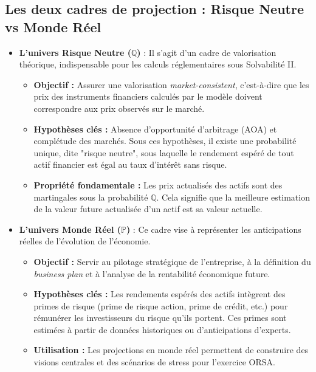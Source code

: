 \subsection{Les deux cadres de projection : Risque Neutre vs Monde Réel}
\begin{itemize}
    \item \textbf{L'univers Risque Neutre ($\mathbb{Q}$)} : Il s'agit d'un cadre de valorisation théorique, indispensable pour les calculs réglementaires sous Solvabilité II.
    \begin{itemize}
        \item \textbf{Objectif :} Assurer une valorisation \textit{market-consistent}, c'est-à-dire que les prix des instruments financiers calculés par le modèle doivent correspondre aux prix observés sur le marché.
        \item \textbf{Hypothèses clés :} Absence d'opportunité d'arbitrage (AOA) et complétude des marchés. Sous ces hypothèses, il existe une probabilité unique, dite "risque neutre", sous laquelle le rendement espéré de tout actif financier est égal au taux d'intérêt sans risque.
        \item \textbf{Propriété fondamentale :} Les prix actualisés des actifs sont des martingales sous la probabilité $\mathbb{Q}$. Cela signifie que la meilleure estimation de la valeur future actualisée d'un actif est sa valeur actuelle.
    \end{itemize}
    \item \textbf{L'univers Monde Réel ($\mathbb{P}$)} : Ce cadre vise à représenter les anticipations réelles de l'évolution de l'économie.
    \begin{itemize}
        \item \textbf{Objectif :} Servir au pilotage stratégique de l'entreprise, à la définition du \textit{business plan} et à l'analyse de la rentabilité économique future.
        \item \textbf{Hypothèses clés :} Les rendements espérés des actifs intègrent des primes de risque (prime de risque action, prime de crédit, etc.) pour rémunérer les investisseurs du risque qu'ils portent. Ces primes sont estimées à partir de données historiques ou d'anticipations d'experts.
        \item \textbf{Utilisation :} Les projections en monde réel permettent de construire des visions centrales et des scénarios de stress pour l'exercice ORSA.
    \end{itemize}
\end{itemize}



